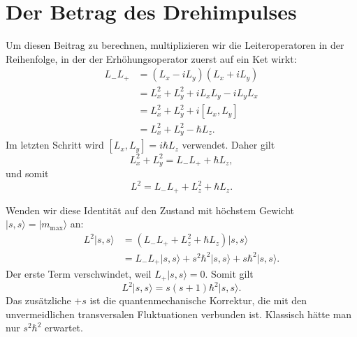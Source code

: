 \section{Der Betrag des Drehimpulses}

\begin{classroomqa}
\end{classroomqa}

Um diesen Beitrag zu berechnen, multiplizieren wir die Leiteroperatoren in der Reihenfolge, in der der Erhöhungsoperator zuerst auf ein Ket wirkt:
\begin{align}
L_-L_+
&=(L_x-iL_y)(L_x+iL_y) \\
&=L_x^2+L_y^2+iL_xL_y-iL_yL_x \\
&=L_x^2+L_y^2+i[L_x,L_y] \\
&=L_x^2+L_y^2-\hbar L_z.
\end{align}
Im letzten Schritt wird \([L_x,L_y]=i\hbar L_z\) verwendet. Daher gilt
\begin{equation}
L_x^2+L_y^2=L_-L_++\hbar L_z,
\end{equation}
und somit
\begin{equation}
L^2=L_-L_++L_z^2+\hbar L_z.
\end{equation}

Wenden wir diese Identität auf den Zustand mit höchstem Gewicht \(\lvert s,s\rangle=\lvert m_{\max}\rangle\) an:
\begin{align}
L^2\lvert s,s\rangle
&=\left(L_-L_++L_z^2+\hbar L_z\right)\lvert s,s\rangle \\
&=L_-L_+\lvert s,s\rangle
+s^2\hbar^2\lvert s,s\rangle
+s\hbar^2\lvert s,s\rangle.
\end{align}
Der erste Term verschwindet, weil \(L_+\lvert s,s\rangle=0\). Somit gilt
\begin{equation}
L^2\lvert s,s\rangle
=s(s+1)\hbar^2\lvert s,s\rangle.
\end{equation}
Das zusätzliche \(+s\) ist die quantenmechanische Korrektur, die mit den unvermeidlichen transversalen Fluktuationen verbunden ist. Klassisch hätte man nur \(s^2\hbar^2\) erwartet.

